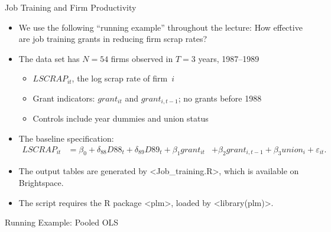 \documentclass[english, professionalfonts,smaller,xcolor=dvipsnames]{beamer}
\def\\{}%
\def\texttt#1{<#1>}%
\begin{document}
\begin{frame}{Job Training and Firm Productivity}
\begin{itemize}
\item We use the following ``running example'' throughout the lecture: How effective are job training grants in reducing firm scrap rates?
\item The data set has $N=54$ firms observed in $T=3$ years, 1987--1989
\begin{itemize}
\item $LSCRAP_{it}$, the log scrap rate of firm~$i$
\item Grant indicators: $grant_{it}$ and $grant_{i,t-1}$; no grants before 1988
\item Controls include year dummies and union status
\end{itemize}
\item The baseline specification:
$$
\begin{aligned}
LSCRAP_{it} &= \beta_0 + \delta_{88}D88_t + \delta_{89}D89_t
+ \beta_1 grant_{it} \\
&+ \beta_2 grant_{i,t-1} + \beta_3 union_i + \varepsilon_{it}.
\end{aligned}
$$
\item The output tables are generated by \texttt{Job\_training.R}, which is available on Brightspace.
\item The script requires the R package \texttt{plm}, loaded by \texttt{library(plm)}.
\end{itemize}
\end{frame}

\begin{frame}{Running Example: Pooled OLS}

\end{frame}
\end{document}
